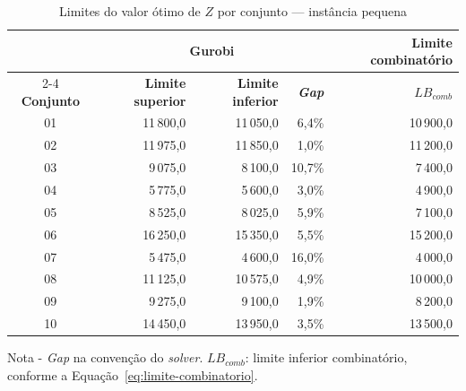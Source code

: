 \begin{table}[htbp]
    \caption{Limites do valor ótimo de $Z$ por conjunto --- instância pequena}
    \label{tab:res-limites-pequeno}
    \centering
    \begin{tabular}{crrrr}
        \hline
        & \multicolumn{3}{c}{\textbf{Gurobi}} & \textbf{Limite combinatório} \\
        \cline{2-4} \cline{5-5}
        \textbf{Conjunto} & \textbf{Limite superior} & \textbf{Limite inferior} & \textbf{\textit{Gap}} & \textbf{$LB_{comb}$} \\
        \hline
        01 & 11\,800,0 & 11\,050,0 & 6,4\% & 10\,900,0 \\
        02 & 11\,975,0 & 11\,850,0 & 1,0\% & 11\,200,0 \\
        03 & 9\,075,0 & 8\,100,0 & 10,7\% & 7\,400,0 \\
        04 & 5\,775,0 & 5\,600,0 & 3,0\% & 4\,900,0 \\
        05 & 8\,525,0 & 8\,025,0 & 5,9\% & 7\,100,0 \\
        06 & 16\,250,0 & 15\,350,0 & 5,5\% & 15\,200,0 \\
        07 & 5\,475,0 & 4\,600,0 & 16,0\% & 4\,000,0 \\
        08 & 11\,125,0 & 10\,575,0 & 4,9\% & 10\,000,0 \\
        09 & 9\,275,0 & 9\,100,0 & 1,9\% & 8\,200,0 \\
        10 & 14\,450,0 & 13\,950,0 & 3,5\% & 13\,500,0 \\
        \hline
    \end{tabular}
    \par\smallskip
    {\footnotesize Nota - \textit{Gap} na convenção do \textit{solver}. $LB_{comb}$: limite inferior combinatório, conforme a Equação~\eqref{eq:limite-combinatorio}.}
\end{table}

